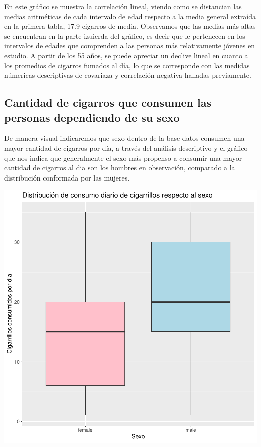 \documentclass[
  stu,
  longtable,
  nolmodern,
  notxfonts,
  notimes,
  colorlinks=true,linkcolor=blue,citecolor=blue,urlcolor=blue]{apa7}
\begin{document}
En este gráfico se muestra la correlación lineal, viendo como se
distancian las medias aritméticas de cada intervalo de edad respecto a
la media general extraída en la primera tabla, 17.9 cigarros de media.
Observamos que las medias más altas se encuentran en la parte izuierda
del gráfico, es decir que le pertenecen en los intervalos de edades que
comprenden a las personas más relativamente jóvenes en estudio. A partir
de los 55 años, se puede apreciar un declive lineal en cuanto a los
promedios de cigarros fumados al día, lo que se corresponde con las
medidas númericas descriptivas de covariaza y correlación negativa
halladas previamente.

\subsection{Cantidad de cigarros que consumen las personas dependiendo
de su
sexo}\label{cantidad-de-cigarros-que-consumen-las-personas-dependiendo-de-su-sexo}

De manera visual indicaremos que sexo dentro de la base datos consumen
una mayor cantidad de cigarros por día, a través del análisis
descriptivo y el gráfico que nos indica que generalmente el sexo más
propenso a consumir una mayor cantidad de cigarros al dia son los
hombres en observación, comparado a la distribución conformada por las
mujeres.

\includegraphics{Plantilla_Apa_files/figure-pdf/unnamed-chunk-2-1.pdf}
\end{document}
